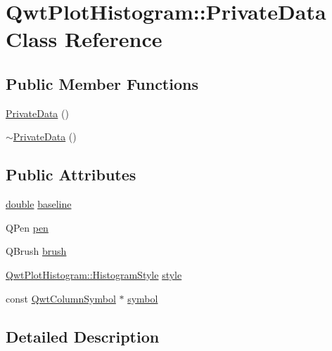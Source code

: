 \hypertarget{class_qwt_plot_histogram_1_1_private_data}{\section{Qwt\-Plot\-Histogram\-:\-:Private\-Data Class Reference}
\label{class_qwt_plot_histogram_1_1_private_data}
}
\subsection*{Public Member Functions}
\begin{DoxyCompactItemize}
\item 
\hyperlink{class_qwt_plot_histogram_1_1_private_data_a3cfae2fd1dac6ae60ce41c76c9ce89fa}{Private\-Data} ()
\item 
\hyperlink{class_qwt_plot_histogram_1_1_private_data_a4961053b7cf1b367c9fe381b71ad200f}{$\sim$\-Private\-Data} ()
\end{DoxyCompactItemize}
\subsection*{Public Attributes}
\begin{DoxyCompactItemize}
\item 
\hyperlink{_super_l_u_support_8h_a8956b2b9f49bf918deed98379d159ca7}{double} \hyperlink{class_qwt_plot_histogram_1_1_private_data_af35e199fd6aa5ac860b6d555404251ac}{baseline}
\item 
Q\-Pen \hyperlink{class_qwt_plot_histogram_1_1_private_data_a813b2a778b95099851f8771eed23e3ca}{pen}
\item 
Q\-Brush \hyperlink{class_qwt_plot_histogram_1_1_private_data_a60144f46627708c2d71560801589913e}{brush}
\item 
\hyperlink{class_qwt_plot_histogram_a3ba21c3aef994daf7b848ccf71b0dbc5}{Qwt\-Plot\-Histogram\-::\-Histogram\-Style} \hyperlink{class_qwt_plot_histogram_1_1_private_data_a555a4f54bbf403dacab01a932c3a0963}{style}
\item 
const \hyperlink{class_qwt_column_symbol}{Qwt\-Column\-Symbol} $\ast$ \hyperlink{class_qwt_plot_histogram_1_1_private_data_adfcb3fcd4a8f8baec68bbe7c224f72a8}{symbol}
\end{DoxyCompactItemize}


\subsection{Detailed Description}


